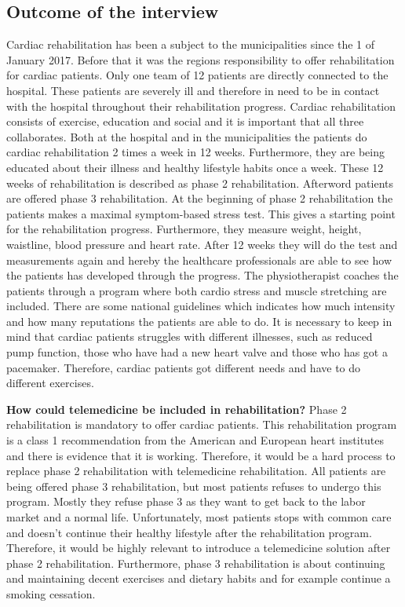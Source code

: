 \subsection{Outcome of the interview} 
Cardiac rehabilitation has been a subject to the municipalities since the 1 of January 2017. Before that it was the regions responsibility to offer rehabilitation for cardiac patients. Only one team of 12 patients are directly connected to the hospital. These patients are severely ill and therefore in need to be in contact with the hospital throughout their rehabilitation progress. Cardiac rehabilitation consists of exercise, education and social and it is important that all three collaborates. Both at the hospital and in the municipalities the patients do cardiac rehabilitation 2 times a week in 12 weeks. Furthermore, they are being educated about their illness and healthy lifestyle habits once a week. These 12 weeks of rehabilitation is described as phase 2 rehabilitation. Afterword patients are offered phase 3 rehabilitation. At the beginning of phase 2 rehabilitation the patients makes a maximal symptom-based stress test. This gives a starting point for the rehabilitation progress. Furthermore, they measure weight, height, waistline, blood pressure and heart rate. After 12 weeks they will do the test and measurements again and hereby the healthcare professionals are able to see how the patients has developed through the progress. The physiotherapist coaches the patients through a program where both cardio stress and muscle stretching are included. There are some national guidelines which indicates how much intensity and how many reputations the patients are able to do. It is necessary to keep in mind that cardiac patients struggles with different illnesses, such as reduced pump function, those who have had a new heart valve and those who has got a pacemaker. Therefore, cardiac patients got different needs and have to do different exercises.  

\textbf{How could telemedicine be included in rehabilitation?} \newline 
Phase 2 rehabilitation is mandatory to offer cardiac patients. This rehabilitation program is a class 1 recommendation from the American and European heart institutes and there is evidence that it is working. Therefore, it would be a hard process to replace phase 2 rehabilitation with telemedicine rehabilitation. All patients are being offered phase 3 rehabilitation, but most patients refuses to undergo this program. Mostly they refuse phase 3 as they want to get back to the labor market and a normal life. Unfortunately, most patients stops with common care and doesn’t continue their healthy lifestyle after the rehabilitation program. Therefore, it would be highly relevant to introduce a telemedicine solution after phase 2 rehabilitation. Furthermore, phase 3 rehabilitation is about continuing and maintaining decent exercises and dietary habits and for example continue a smoking cessation. 

